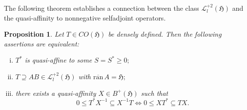 \documentclass{amsart}
\newtheorem{proposition}[theorem]{Proposition}
\newcommand{\ifaf}{\Leftrightarrow}
\newcommand{\h}{\mathfrak{H}}
\newcommand{\ranbarA}{\mathrm{\overline{ran}}\, A}
\newcommand{\adj}{^*}
\newcommand{\inv}{^{-1}}
\newcommand{\tstar}{T^{*}}
\newcommand{\half}{^{\frac{1}{2}}}
\newcommand{\mhalf}{^{-\frac{1}{2}}}
\newcommand{\inclu}{\subseteq}
\newcommand{\lplus}{B^{+}(\h)}
\newcommand{\ldeux}{\mathcal{L}_l^{+2}(\h)}
\numberwithin{equation}{section}
\renewcommand{\labelenumi}{(\arabic{enumi})}
\begin{document}
The following theorem  establishes a connection between the class $\ldeux$ and the quasi-affinity to nonnegative selfadjoint operators.


\begin{proposition}\label{inclusionnfs}
  Let $T\in CO(\h) $ be densely defined. Then the following assertions are equivalent:
   \begin{enumerate}[(i)]\def\labelenumi{\rm(\roman{enumi})}
       \item  $\tstar$ is  quasi-affine to   some  $S = S\adj \geq 0;$
       \item $T \supseteq  AB \in \ldeux$  with $\ranbarA =\h;$
        \item there exists a quasi-affinity $X \in \lplus$   such that
        $$
         0 \leq  \tstar X\inv \inclu  X\inv  T \ifaf  0 \leq X\tstar \inclu TX.
         $$
   \end{enumerate}
\end{proposition}
\end{document}
